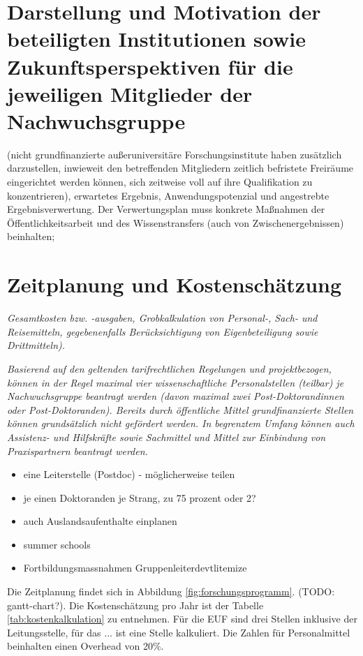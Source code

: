 \documentclass[a4paper,11pt,twoside]{scrartcl}
\begin{document}
\section{Darstellung und Motivation der beteiligten Institutionen sowie Zukunftsperspektiven für die jeweiligen Mitglieder der Nachwuchsgruppe}
(nicht grundfinanzierte außeruniversitäre Forschungsinstitute haben zusätzlich darzustellen, ­inwieweit den betreffenden Mitgliedern zeitlich befristete Freiräume eingerichtet werden können, sich zeitweise voll auf ihre Qualifikation zu konzentrieren), erwartetes Ergebnis, Anwendungspotenzial und angestrebte Ergebnisverwertung. Der Verwertungsplan muss konkrete Maßnahmen der Öffentlichkeitsarbeit und des Wissenstransfers (auch von Zwischenergebnissen) beinhalten;

\section{Zeitplanung und Kostenschätzung}
\textit{Gesamtkosten bzw. -ausgaben, Grobkalkulation von Personal-, Sach- und Reisemitteln, gegebenenfalls Berücksichtigung von Eigenbeteiligung sowie Drittmitteln).}

\textit{Basierend auf den geltenden tarifrechtlichen Regelungen und projektbezogen, können in der Regel maximal vier wissenschaftliche Personalstellen (teilbar) je Nachwuchsgruppe beantragt werden (davon maximal zwei Post-Doktorandinnen oder Post-Doktoranden). Bereits durch öffentliche Mittel grundfinanzierte Stellen können grundsätzlich nicht gefördert werden.
In begrenztem Umfang können auch Assistenz- und Hilfskräfte sowie Sachmittel und Mittel zur Einbindung von Praxispartnern beantragt werden.}
\begin{itemize}
    \item eine Leiterstelle (Postdoc) - möglicherweise teilen
    \item je einen Doktoranden je Strang, zu 75 prozent oder 2?
    \item auch Auslandsaufenthalte einplanen
    \item summer schools
    \item Fortbildungsmassnahmen Gruppenleiterd{evtlitemize}
\end{itemize}

Die Zeitplanung findet sich in Abbildung \ref{fig:forschungsprogramm}. (TODO: gantt-chart?). Die Kostenschätzung pro Jahr ist der Tabelle \ref{tab:kostenkalkulation} zu entnehmen. Für die EUF sind drei Stellen inklusive der Leitungsstelle, für das ... ist eine Stelle kalkuliert. Die Zahlen für Personalmittel beinhalten einen Overhead von 20\%.
\end{document}
